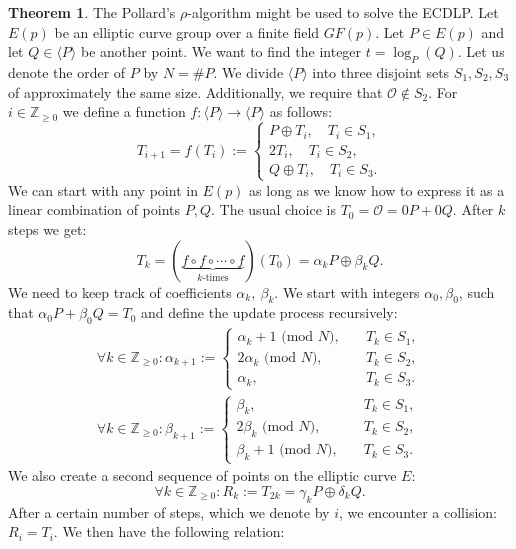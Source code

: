 \documentclass[thesis=M,english]{FITthesis}[2012/10/20]
\theoremstyle{remark}
\theoremstyle{definition}
\newtheorem{theorem}{Theorem}[section]
\begin{document}
 \begin{theorem}
 The Pollard's $\rho$-algorithm might be used to solve the ECDLP. Let $E(p)$ be an elliptic curve group over a finite field $GF(p)$. Let $P \in E(p)$ and let $Q \in \langle P \rangle$ be another point. We want to find the integer $t=\log_P(Q)$. Let us denote the order of $P$ by $N = \#P$. We divide $\langle P \rangle$ into three disjoint sets $S_1, S_2, S_3$ of approximately the same size. Additionally, we require that $\mathcal{O} \not\in S_2$. For $i \in \mathbb{Z}_{\geq 0}$ we define a function $f: \langle P \rangle \to \langle P \rangle$ as follows:
 $$
 T_{i+1} = f(T_i) := \begin{cases} P \oplus T_i,\quad T_i \in S_1, \\
 2T_i, \quad T_i \in S_2, \\
 Q \oplus T_i, \quad T_i \in S_3.
 \end{cases}
 $$
 We can start with any point in $E(p)$ as long as we know how to express it as a linear combination of points $P,Q$. The usual choice is $T_0 = \mathcal{O} = 0P + 0Q$. After $k$ steps we get:
 $$
 T_k = (\underbrace{f\circ f \circ \cdots \circ f}_\text{$k$-times})(T_0) = \alpha_k P \oplus \beta_k Q.
 $$
 We need to keep track of coefficients $\alpha_k,\ \beta_k$. We start with integers $\alpha_0, \beta_0$, such that $\alpha_0P + \beta_0Q = T_0$ and define the update process recursively:
\begin{align*}
 \forall k \in \mathbb{Z}_{\geq 0}:  \alpha_{k+1} := \begin{cases} \alpha_k + 1\text{ (mod $N$)},\quad &T_k \in S_1, \\
 2\alpha_k\text{ (mod $N$)}, \quad &T_k \in S_2, \\
 \alpha_k, \quad &T_k \in S_3.
 \end{cases} \\
   \forall k \in \mathbb{Z}_{\geq 0}: \beta_{k+1} := \begin{cases} \beta_k,\quad &T_k \in S_1, \\
 2\beta_k\text{ (mod $N$)}, \quad &T_k \in S_2, \\
 \beta_k + 1\text{ (mod $N$)}, \quad &T_k \in S_3.
 \end{cases}
 \end{align*}
We also create a second sequence of points on the elliptic curve $E$: 
$$\forall k \in \mathbb{Z}_{\geq 0}: R_k := T_{2k} = \gamma_kP \oplus \delta_kQ.$$
After a certain number of steps, which we denote by $i$, we encounter a collision: $R_i = T_i$. We then have the following relation: 

\end{theorem}
\end{document}

